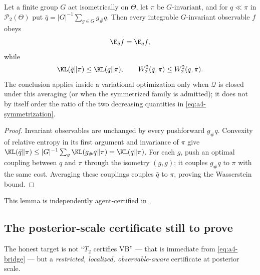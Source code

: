 \documentclass[../../main.tex]{subfiles}
\begin{document}
\begin{lemma}
\label{lem:a4-symmetrization}
Let a finite group $G$ act isometrically on $\Theta$, let $\pi$ be $G$-invariant, and for
$q\ll\pi$ in $\mathcal P_2(\Theta)$ put
$\bar q=|G|^{-1}\sum_{g\in G}g_\#q$. Then every integrable $G$-invariant observable $f$ obeys
\[
 \E_{\bar q}f=\E_qf,
\]
while
\begin{equation}\label{eq:a4-symmetrization}
 \KL(\bar q\|\pi)\le\KL(q\|\pi),
 \qquad W_2^2(\bar q,\pi)\le W_2^2(q,\pi).
\end{equation}
The conclusion applies inside a variational optimization only when $\mathcal Q$ is closed under
this averaging (or when the symmetrized family is admitted); it does not by itself order the
ratio of the two decreasing quantities in \eqref{eq:a4-symmetrization}.
\end{lemma}

\begin{proof}
Invariant observables are unchanged by every pushforward $g_\#q$. Convexity of relative entropy
in its first argument and invariance of $\pi$ give
$\KL(\bar q\|\pi)\le |G|^{-1}\sum_g\KL(g_\#q\|\pi)=\KL(q\|\pi)$. For each $g$, push an optimal
coupling between $q$ and $\pi$ through the isometry $(g,g)$; it couples $g_\#q$ to $\pi$ with the
same cost. Averaging these couplings couples $\bar q$ to $\pi$, proving the Wasserstein bound.
\end{proof}

\noindent This lemma is independently agent-certified in
.

\subsection{The posterior-scale certificate still to prove}
\label{subsec:a4-theorem}

The honest target is not ``$T_2$ certifies VB'' --- that is immediate from \eqref{eq:a4-bridge}
--- but a \emph{restricted, localized, observable-aware} certificate at posterior scale.
\end{document}
